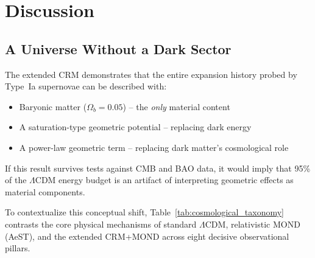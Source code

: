 \documentclass[aps,prd,twocolumn,superscriptaddress,nofootinbib,floatfix]{revtex4-2}
\begin{document}
\section{Discussion}
\label{sec:discussion}

\subsection{A Universe Without a Dark Sector}

The extended CRM demonstrates that the entire expansion history probed by Type~Ia supernovae can be described with:
\begin{itemize}
\item Baryonic matter ($\Omega_b = 0.05$) -- the \textit{only} material content
\item A saturation-type geometric potential -- replacing dark energy
\item A power-law geometric term -- replacing dark matter's cosmological role
\end{itemize}

If this result survives tests against CMB and BAO data, it would imply that 95\% of the $\Lambda$CDM energy budget is an artifact of interpreting geometric effects as material components.

To contextualize this conceptual shift, Table~\ref{tab:cosmological_taxonomy} contrasts the core physical mechanisms of standard $\Lambda$CDM, relativistic MOND (AeST), and the extended CRM+MOND across eight decisive observational pillars.
\end{document}
